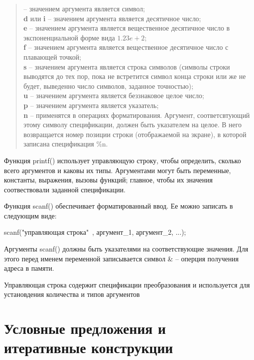 \documentclass[a4paper, fontsize=10bp]{article} %
\begin{document}
\begin{quotation}
    
     -- значением аргумента является символ;
\\
    {\textbf d} или {\textbf i} -- значением аргумента является десятичное число;
\\
    {\textbf e} -- значением аргумента является вещественное десятичное число в экспоненциальной форме вида
    $1.23e+2$;
\\
    {\textbf f} -- значением аргумента является вещественное десятичное число с плавающей точкой;
\\
    {\textbf s} -- значением аргумента является строка символов (символы строки выводятся до тех пор, пока не 
                    встретится символ конца строки или же не будет, выведенно число символов, заданное точностью);
\\
    {\textbf u} -- значением аргумента является беззнаковое целое число;
\\
    {\textbf p} -- значением аргумента является указатель;
\\
    {\textbf n} -- применятся в операциях форматирования. Аргумент, соответсвтующий этому символу
                    спецификации, должен быть указателем на целое. В него возвращается номер позиции строки
                    (отображаемой на зкране), в которой записана спецификация \%n.

\end{quotation}

Функция printf() использует управляющую строку, чтобы определить, сколько всего аргументов и каковы
их типы. Аргументами могут быть переменные, константы, выражения, вызовы функций; главное, чтобы их
значения соотвествовали заданной спецификации.

\noindent Функция scanf() обеспечивает форматированный ввод. Ее можно записать в следующим виде:

scanf("управляющая строка"\ , аргумент\_1, аргумент\_2, ...);

\noindent Аргументы scanf() должны быть указателями на соответствующие значения. Для этого перед именем
переменной записывается символ \& -- оперция получения адреса в памяти.

\noindent Управляющая строка содержит спецификации преобразования и используется для установдения количества
и типов аргументов


\section{Условные предложения и итеративные конструкции}
\end{document}

